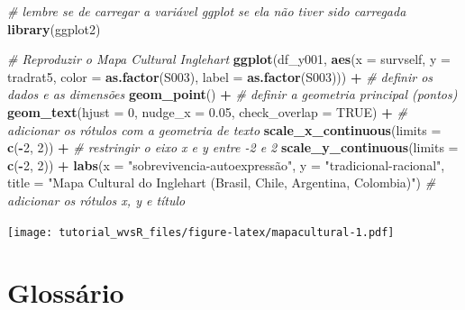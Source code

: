 \documentclass[
  brazil,
]{book}
\newenvironment{Shaded}{\begin{snugshade}}{\end{snugshade}}
\newcommand{\CommentTok}[1]{\textcolor[rgb]{0.56,0.35,0.01}{\textit{#1}}}
\newcommand{\DataTypeTok}[1]{\textcolor[rgb]{0.13,0.29,0.53}{#1}}
\newcommand{\DecValTok}[1]{\textcolor[rgb]{0.00,0.00,0.81}{#1}}
\newcommand{\FloatTok}[1]{\textcolor[rgb]{0.00,0.00,0.81}{#1}}
\newcommand{\KeywordTok}[1]{\textcolor[rgb]{0.13,0.29,0.53}{\textbf{#1}}}
\newcommand{\NormalTok}[1]{#1}
\newcommand{\OperatorTok}[1]{\textcolor[rgb]{0.81,0.36,0.00}{\textbf{#1}}}
\newcommand{\OtherTok}[1]{\textcolor[rgb]{0.56,0.35,0.01}{#1}}
\newcommand{\StringTok}[1]{\textcolor[rgb]{0.31,0.60,0.02}{#1}}
\begin{document}
\begin{Shaded}
\begin{Highlighting}[]
\CommentTok{# lembre se de carregar a variável ggplot se ela não tiver sido carregada }
\KeywordTok{library}\NormalTok{(ggplot2)}

\CommentTok{# Reproduzir o Mapa Cultural Inglehart }
\KeywordTok{ggplot}\NormalTok{(df_y001, }\KeywordTok{aes}\NormalTok{(}\DataTypeTok{x =}\NormalTok{ survself, }
                    \DataTypeTok{y =}\NormalTok{ tradrat5, }
                    \DataTypeTok{color =} \KeywordTok{as.factor}\NormalTok{(S003), }
                    \DataTypeTok{label =} \KeywordTok{as.factor}\NormalTok{(S003))) }\OperatorTok{+}\StringTok{ }\CommentTok{# definir os dados e as dimensões}
\StringTok{  }\KeywordTok{geom_point}\NormalTok{() }\OperatorTok{+}\StringTok{ }\CommentTok{# definir a geometria principal (pontos)}
\StringTok{  }\KeywordTok{geom_text}\NormalTok{(}\DataTypeTok{hjust =} \DecValTok{0}\NormalTok{, }\DataTypeTok{nudge_x =} \FloatTok{0.05}\NormalTok{, }\DataTypeTok{check_overlap =} \OtherTok{TRUE}\NormalTok{) }\OperatorTok{+}\StringTok{ }\CommentTok{# adicionar os rótulos com a geometria de texto}
\StringTok{  }\KeywordTok{scale_x_continuous}\NormalTok{(}\DataTypeTok{limits =} \KeywordTok{c}\NormalTok{(}\OperatorTok{-}\DecValTok{2}\NormalTok{, }\DecValTok{2}\NormalTok{)) }\OperatorTok{+}\StringTok{ }\CommentTok{# restringir o eixo x e y entre -2 e 2}
\StringTok{  }\KeywordTok{scale_y_continuous}\NormalTok{(}\DataTypeTok{limits =} \KeywordTok{c}\NormalTok{(}\OperatorTok{-}\DecValTok{2}\NormalTok{, }\DecValTok{2}\NormalTok{)) }\OperatorTok{+}
\StringTok{  }\KeywordTok{labs}\NormalTok{(}\DataTypeTok{x =} \StringTok{"sobrevivencia-autoexpressão"}\NormalTok{,}
       \DataTypeTok{y =} \StringTok{"tradicional-racional"}\NormalTok{,}
       \DataTypeTok{title =} \StringTok{"Mapa Cultural do Inglehart (Brasil, Chile, Argentina, Colombia)"}\NormalTok{) }\CommentTok{# adicionar os rótulos x, y e título}
\end{Highlighting}
\end{Shaded}

\texttt{[image: tutorial\_wvsR\_files/figure-latex/mapacultural-1.pdf]}

\hypertarget{glossuxe1rio}{%
\chapter{Glossário}\label{glossuxe1rio}}
\end{document}
